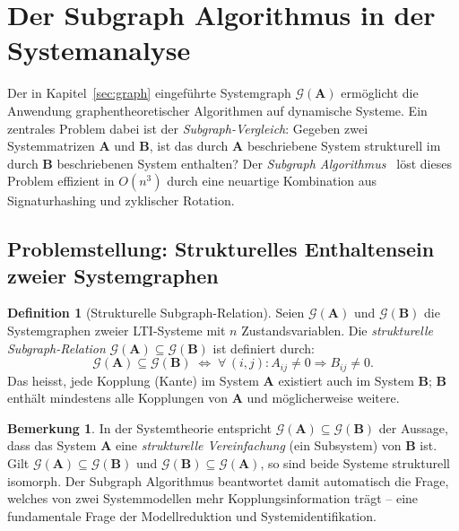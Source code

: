 \documentclass[a4paper, 12pt, twoside, openright]{report}
\theoremstyle{definition}
\newtheorem{definition}[theorem]{Definition}
\newtheorem{remark}[theorem]{Bemerkung}
\theoremstyle{definition}
\newcommand{\vA}{\bm{A}}
\newcommand{\vB}{\bm{B}}
\begin{document}
\section{Der Subgraph Algorithmus in der Systemanalyse}
\label{sec:subgraph}

Der in Kapitel~\ref{sec:graph} eingeführte Systemgraph $\mathcal{G}(\vA)$ ermöglicht
die Anwendung graphentheoretischer Algorithmen auf dynamische Systeme. Ein zentrales
Problem dabei ist der \emph{Subgraph-Vergleich}: Gegeben zwei Systemmatrizen
$\vA$ und $\vB$, ist das durch $\vA$ beschriebene System strukturell im durch $\vB$
beschriebenen System enthalten? Der \emph{Subgraph Algorithmus}~\citep{epp2026subgraph}
löst dieses Problem effizient in $O(n^3)$ durch eine neuartige Kombination aus
Signaturhashing und zyklischer Rotation.

\subsection{Problemstellung: Strukturelles Enthaltensein zweier Systemgraphen}

\begin{definition}[Strukturelle Subgraph-Relation]
\label{def:subgraph_rel}
Seien $\mathcal{G}(\vA)$ und $\mathcal{G}(\vB)$ die Systemgraphen zweier
LTI-Systeme mit $n$ Zustandsvariablen. Die \emph{strukturelle Subgraph-Relation}
$\mathcal{G}(\vA) \subseteq \mathcal{G}(\vB)$ ist definiert durch:
\begin{equation}
  \mathcal{G}(\vA) \subseteq \mathcal{G}(\vB)
  \;\Longleftrightarrow\;
  \forall\,(i,j): A_{ij} \neq 0 \Rightarrow B_{ij} \neq 0.
  \label{eq:subgraph_rel}
\end{equation}
Das heisst, jede Kopplung (Kante) im System $\vA$ existiert auch im System $\vB$;
$\vB$ enthält mindestens alle Kopplungen von $\vA$ und möglicherweise weitere.
\end{definition}

\begin{remark}
In der Systemtheorie entspricht $\mathcal{G}(\vA) \subseteq \mathcal{G}(\vB)$ der
Aussage, dass das System $\vA$ eine \emph{strukturelle Vereinfachung} (ein
Subsystem) von $\vB$ ist. Gilt $\mathcal{G}(\vA) \subseteq \mathcal{G}(\vB)$
und $\mathcal{G}(\vB) \subseteq \mathcal{G}(\vA)$, so sind beide Systeme strukturell
isomorph. Der Subgraph Algorithmus beantwortet damit automatisch die Frage, welches
von zwei Systemmodellen mehr Kopplungsinformation trägt -- eine fundamentale Frage
der Modellreduktion und Systemidentifikation.
\end{remark}
\end{document}
